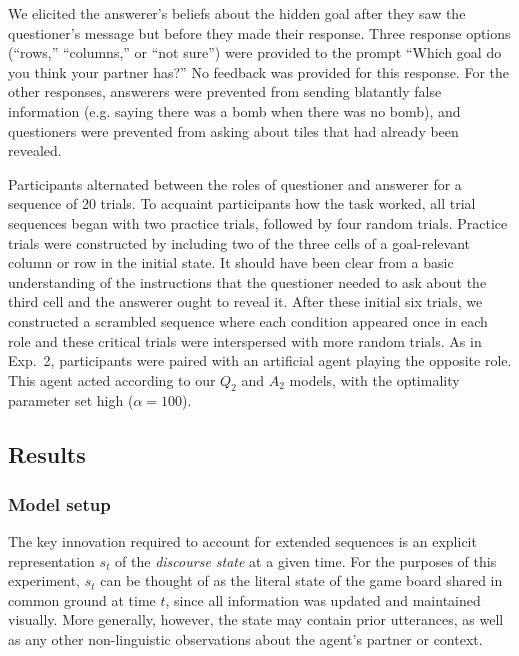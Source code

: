 \documentclass[11pt, floatsintext]{apa6}
\begin{document}
We elicited the answerer's beliefs about the hidden goal after they saw the questioner's message but before they made their response.
Three response options (``rows,'' ``columns,'' or ``not sure'') were provided to the prompt ``Which goal do you think your partner has?'' 
No feedback was provided for this response.
For the other responses, answerers were prevented from sending blatantly false information (e.g. saying there was a bomb when there was no bomb), and questioners were prevented from asking about tiles that had already been revealed.

Participants alternated between the roles of questioner and answerer for a sequence of 20 trials. 
To acquaint participants how the task worked, all trial sequences began with two practice trials, followed by four random trials.
Practice trials were constructed by including two of the three cells of a goal-relevant column or row in the initial state. 
It should have been clear from a basic understanding of the instructions that the questioner needed to ask about the third cell and the answerer ought to reveal it. 
After these initial six trials, we constructed a scrambled sequence where each condition appeared once in each role and these critical trials were interspersed with more random trials.
As in Exp.~2, participants were paired with an artificial agent playing the opposite role. 
This agent acted according to our $Q_2$ and $A_2$ models, with the optimality parameter set high ($\alpha = 100$). 

\subsection{Results}

\subsubsection{Model setup}

The key innovation required to account for extended sequences is an explicit representation $s_t$ of the \emph{discourse state} at a given time. 
For the purposes of this experiment, $s_t$ can be thought of as the literal state of the game board shared in common ground at time $t$, since all information was updated and maintained visually.
More generally, however, the state may contain prior utterances, as well as any other non-linguistic observations about the agent's partner or context.
\end{document}
